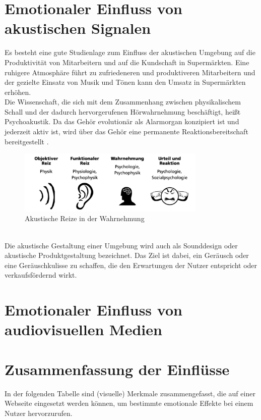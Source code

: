 \documentclass[./dokumentation.tex]{subfiles}
\begin{document}
\section{Emotionaler Einfluss von akustischen Signalen}
Es besteht eine gute Studienlage zum Einfluss der akustischen Umgebung auf die Produktivität von Mitarbeitern und auf die Kundschaft in Supermärkten. Eine ruhigere Atmosphäre führt zu zufriedeneren und produktiveren Mitarbeitern und der gezielte Einsatz von Musik und Tönen kann den Umsatz in Supermärkten erhöhen. \\
Die Wissenschaft, die sich mit dem Zusammenhang zwischen physikalischem Schall und der dadurch hervorgerufenen Hörwahrnehmung beschäftigt, heißt Psychoakustik. Da das Gehör evolutionär als Alarmorgan konzipiert ist und jederzeit aktiv ist, wird über das Gehör eine permanente Reaktionsbereitschaft bereitgestellt \cite{fraunhofer}.\\

\begin{figure}[H]
    \centering
    \includegraphics[width=0.8\textwidth]{bilder/fraunhofer_akustik.png}
    \caption{Akustische Reize in der Wahrnehmung \cite{fraunhofer}}
    \label{fig10:fraunhofer}
\end{figure}\\

Die akustische Gestaltung einer Umgebung wird auch als Sounddesign oder akustische Produktgestaltung bezeichnet. Das Ziel ist dabei, ein Geräusch oder eine Geräuschkulisse zu schaffen, die den Erwartungen der Nutzer entspricht oder verkaufsfördernd wirkt. \\

\section{Emotionaler Einfluss von audiovisuellen Medien} %

\section{Zusammenfassung der Einflüsse} %
In der folgenden Tabelle sind (visuelle) Merkmale zusammengefasst, die auf einer Webseite eingesetzt werden können, um bestimmte emotionale Effekte bei einem Nutzer hervorzurufen. \\
\end{document}
